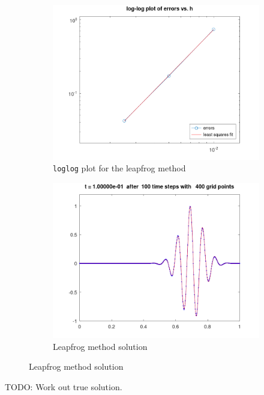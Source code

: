 \begin{solution}
    \begin{figure}[h]
        \centering
        \begin{subfigure}{0.45\textwidth}
            \includegraphics*[width=\textwidth]{problem_4b_error.png}
            \caption{\texttt{loglog} plot for the leapfrog method}
        \end{subfigure}
        \hfill
        \begin{subfigure}{0.45\textwidth}
            \includegraphics*[width=\textwidth]{problem_4b.png}
            \caption{Leapfrog method solution}
        \end{subfigure}
    \end{figure}

    TODO: Work out true solution.
\end{solution}